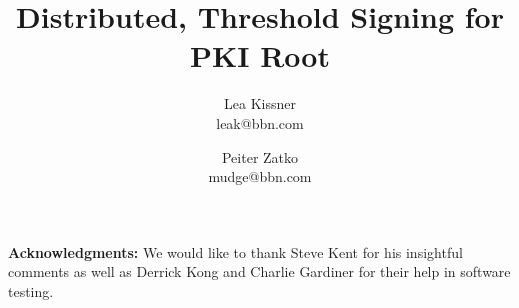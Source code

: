 \documentclass[11pt]{article}
\title{Distributed, Threshold Signing for PKI Root}
\author{Lea Kissner \\ leak@bbn.com \and Peiter Zatko \\ mudge@bbn.com}
\date{}
\theoremstyle{definition}
\theoremstyle{remark}
\begin{document}
\maketitle

%









\vspace{.25in}
{\bf Acknowledgments:} We would like to thank Steve Kent for his
insightful comments as well as Derrick Kong and Charlie Gardiner for
their help in software testing.





\appendix






\end{document}
